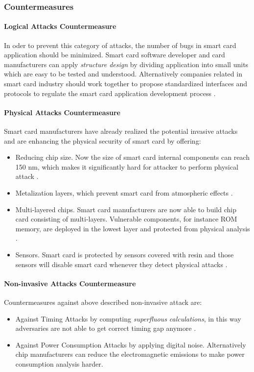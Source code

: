 \subsubsection{Countermeasures} \label{secSMD}
\paragraph{Logical Attacks Countermeasure}
In oder to prevent this category of attacks, the number of bugs in smart card application should be minimized. Smart card software developer and card manufacturers can apply \emph{structure design} by dividing application into small units which are easy to be tested and understood. Alternatively companies related in smart card industry should work together to propose standardized interfaces and protocols to regulate the smart card application development process \cite{smart_card_attack2}.
\paragraph{Physical Attacks Countermeasure}
Smart card manufacturers have already realized the potential  invasive attacks and are enhancing the physical security of smart card by offering:
\begin{itemize}
\item Reducing chip size. Now the size of smart card internal components can reach 150 nm, which makes it significantly hard for attacker to perform physical attack \cite{smart_card_attack3}.
\item Metalization layers, which prevent smart card from atmospheric effects \cite{smart_card_attack3}.
\item Multi-layered chips. Smart card manufacturers are now able to build chip card consisting of multi-layers. Vulnerable components, for instance ROM memory, are deployed in the lowest layer and protected from physical analysis \cite{smart_card_attack3}. 
\item Sensors.  Smart card is protected by sensors covered with resin and those sensors will disable smart card whenever they detect physical attacks \cite{smart_card_attack}.
\end{itemize}
\paragraph{Non-invasive Attacks Countermeasure}
Countermeasures against above described non-invasive attack are:
\begin{itemize}
\item Against Timing Attacks by computing \emph{superfluous calculations}, in this way adversaries are not able  to get correct timing gap anymore \cite{smart_card_attack3} .
\item Against Power Consumption Attacks by applying digital noise. Alternatively chip	 manufacturers can reduce the electromagnetic emissions to make power consumption analysis  harder\cite{smart_card_attack3}.
\end{itemize}
